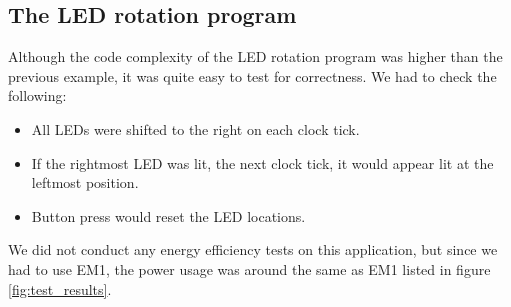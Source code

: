 	\subsection{The LED rotation program}
	Although the code complexity of the LED rotation program was higher than the previous example, it was quite easy to test for correctness. We had to check the following:
	\begin{itemize}
		\item All LEDs were shifted to the right on each clock tick.
		\item If the rightmost LED was lit, the next clock tick, it would appear lit at the leftmost position.
		\item Button press would reset the LED locations.
	\end{itemize}
	We did not conduct any energy efficiency tests on this application, but since we had to use EM1, the power usage was around the same as EM1 listed in figure \ref{fig:test_results}.
